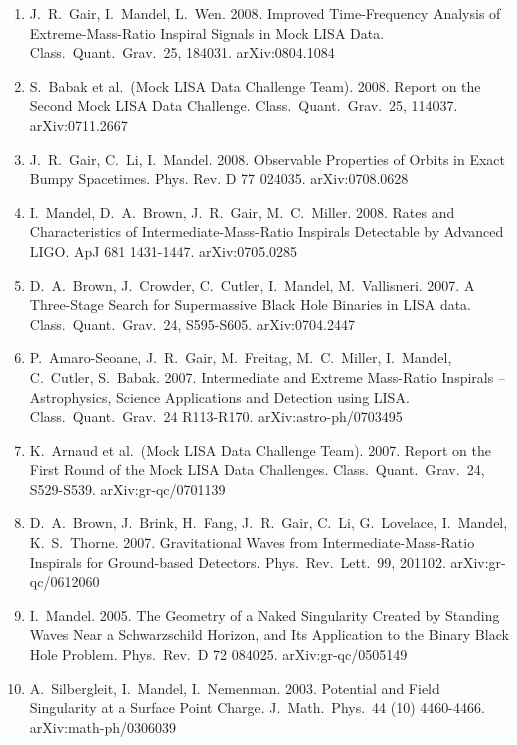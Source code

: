 \documentclass[margin,line]{res}
\begin{document}
\begin{resume}
\begin{enumerate}
\item  J.~R.~Gair, I.~Mandel, L.~Wen. 2008. Improved Time-Frequency Analysis of 
Extreme-Mass-Ratio Inspiral Signals in Mock LISA Data. Class.~Quant.~Grav.~25, 184031.
arXiv:0804.1084

\item  S.~Babak et al.~(Mock LISA Data Challenge Team). 2008. Report on the 
Second Mock LISA Data Challenge.  Class.~Quant.~Grav.~25, 114037.
arXiv:0711.2667

\item  J.~R.~Gair, C.~Li, I.~Mandel. 2008. Observable Properties of Orbits in 
Exact Bumpy Spacetimes.  Phys. Rev. D 77 024035.  arXiv:0708.0628

\item  I.~Mandel, D.~A.~Brown, J.~R.~Gair, M.~C.~Miller. 2008. Rates and 
Characteristics of Intermediate-Mass-Ratio Inspirals Detectable by 
Advanced LIGO.  ApJ 681 1431-1447. arXiv:0705.0285

\item  D.~A.~Brown, J.~Crowder, C.~Cutler, I.~Mandel, M.~Vallisneri. 2007.  A 
Three-Stage Search for Supermassive Black Hole Binaries in LISA data. 
Class.~Quant.~Grav.~24, S595-S605. arXiv:0704.2447

\item  P.~Amaro-Seoane, J.~R.~Gair, M.~Freitag, M.~C.~Miller, I.~Mandel,
C.~Cutler, S.~Babak. 2007.  Intermediate and Extreme Mass-Ratio  
Inspirals -- Astrophysics, Science Applications and Detection using
LISA.  Class.~Quant.~Grav.~24 R113-R170. arXiv:astro-ph/0703495

\item  K.~Arnaud et al.~(Mock LISA Data Challenge Team).  2007. Report on the 
First Round of the Mock LISA Data Challenges.  Class.~Quant.~Grav.~24, 
S529-S539. arXiv:gr-qc/0701139

\item  D.~A.~Brown, J.~Brink, H.~Fang, J.~R.~Gair, C.~Li, G.~Lovelace, 
I.~Mandel, K.~S.~Thorne. 2007.  Gravitational Waves from 
Intermediate-Mass-Ratio Inspirals for Ground-based Detectors. Phys.~Rev.~Lett.~99, 201102. arXiv:gr-qc/0612060

\item  I.~Mandel. 2005. The Geometry of a Naked Singularity Created by Standing 
Waves Near a Schwarzschild Horizon, and Its Application to the Binary 
Black Hole Problem. Phys.~Rev.~D 72 084025.  arXiv:gr-qc/0505149

\item  A.~Silbergleit, I.~Mandel, I.~Nemenman.  2003.  Potential and Field 
Singularity at a Surface Point Charge.  J.~Math.~Phys.~44 (10) 
4460-4466.  arXiv:math-ph/0306039


\end{enumerate}
\end{resume}
\end{document}
